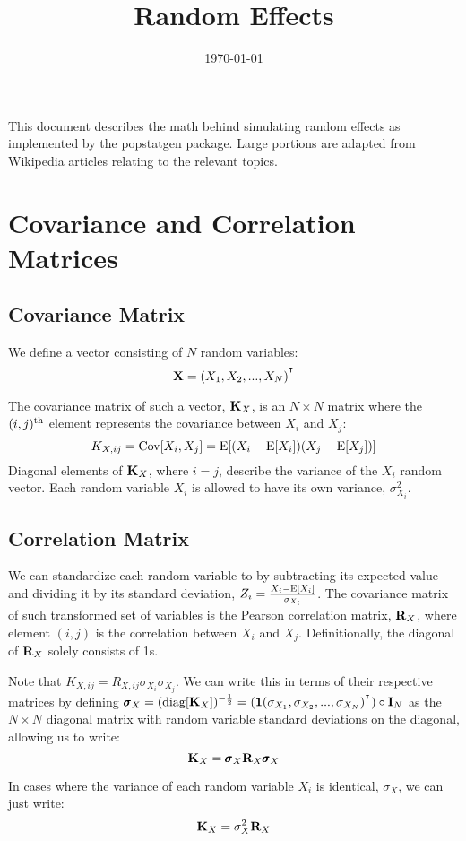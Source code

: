 \documentclass[12pt]{article}
\title{Random Effects}
\date{\today}
\begin{document}
\maketitle

This document describes the math behind simulating random effects as implemented by the popstatgen package.
Large portions are adapted from Wikipedia articles relating to the relevant topics.

\section{Covariance and Correlation Matrices}
\subsection{Covariance Matrix}
We define a vector consisting of $N$ random variables:
$$ \mathbf{X} = (X_1 , X_2, ..., X_N)^{^\intercal} $$

The covariance matrix of such a vector, $\mathbf{K}_X$, is an $N \times N$ matrix where the $(i,j)\textsuperscript{th}$ element represents the covariance between $X_i$ and $X_j$:
$$ K_{X,ij} = \mathrm{Cov}[X_i,X_j] = \mathrm{E}[(X_i - \mathrm{E}[X_i]) (X_j - \mathrm{E}[X_j])]$$
Diagonal elements of $\mathbf{K}_X$, where $i=j$, describe the variance of the $X_i$ random vector.
Each random variable $X_i$ is allowed to have its own variance, $\sigma_{X_i}^2$.

\subsection{Correlation Matrix}
We can standardize each random variable to by subtracting its expected value and dividing it by its standard deviation, $Z_i = \frac{X_i - \mathrm{E}[X_i]}{\sigma_{X_i}}$.
The covariance matrix of such transformed set of variables is the Pearson correlation matrix, $\mathbf{R}_X$, where element $(i,j)$ is the correlation between $X_i$ and $X_j$. 
Definitionally, the diagonal of $\mathbf{R}_X$ solely consists of 1s.

Note that $K_{X,ij} = R_{X,ij} \sigma_{X_i} \sigma_{X_j}$. We can write this in terms of their respective matrices by defining $\pmb{\sigma}_X = (\mathrm{diag}[\mathbf{K}_X])^{-\frac12} =  (\textbf{1} (\sigma_{X_1}, \sigma_{X_2}, ..., \sigma_{X_N})^{^\intercal}) \circ  \mathbf{I}_N$ as the $N \times N$ diagonal matrix with random variable standard deviations on the diagonal, allowing us to write:
$$ \mathbf{K}_X = \pmb{\sigma}_X \mathbf{R}_X \pmb{\sigma}_X $$

In cases where the variance of each random variable $X_i$ is identical, $\sigma_X$, we can just write:
$$ \mathbf{K}_X = \sigma_X^2 \mathbf{R}_X $$
\end{document}
